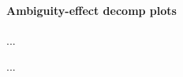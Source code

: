 \documentclass[../main.tex]{subfiles}
\begin{document}



\paragraph{Ambiguity-effect decomp plots} ...

 ...
\end{document}
